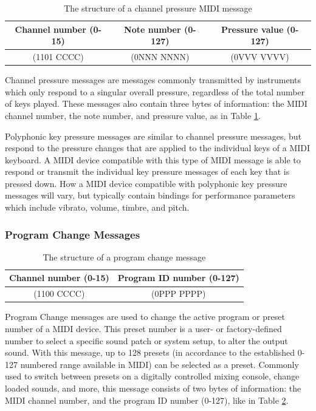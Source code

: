 \begin{table}
	\centering
	\begin{tabular}{|c|c|c|}
	\hline
		Channel number (0-15) & Note number (0-127) & Pressure value (0-127) \\
		\hline
		(1101 CCCC) & (0NNN NNNN) & (0VVV VVVV) \\
	\hline
	\end{tabular}
	\caption{The structure of a channel pressure MIDI message}
	\label{tbl:byte-structure-channel-pressure-messages}
\end{table}

Channel pressure messages are messages commonly transmitted by instruments which only respond to a singular overall pressure, regardless of the total number of keys played. These messages also contain three bytes of information: the MIDI channel number, the note number, and pressure value, as in Table \ref{tbl:byte-structure-channel-pressure-messages}\cite{Huber_2012}. 

Polyphonic key pressure messages are similar to channel pressure messages, but respond to the pressure changes that are applied to the individual keys of a MIDI keyboard. A MIDI device compatible with this type of MIDI message is able to respond or transmit the individual key pressure messages of each key that is pressed down. How a MIDI device compatible with polyphonic key pressure messages will vary, but typically contain bindings for performance parameters which include vibrato, volume, timbre, and pitch\cite{McGuire_2014}. %

\subsubsection{Program Change Messages}

\begin{table}
	\centering
	\begin{tabular}{|c|c|}
	\hline
		Channel number (0-15) & Program ID number (0-127) \\
		\hline
		(1100 CCCC) & (0PPP PPPP) \\
	\hline
	\end{tabular}
	\caption{The structure of a program change message}
	\label{tbl:byte-structure-program-change}
\end{table}

Program Change messages are used to change the active program or preset number of a MIDI device. This preset number is a user- or factory-defined number to select a specific sound patch or system setup, to alter the output sound. With this message, up to 128 presets (in accordance to the established 0-127 numbered range available in MIDI) can be selected as a preset\cite{Huber_2012}. Commonly used to switch between presets on a digitally controlled mixing console, change loaded sounds, and more, this message consists of two bytes of information: the MIDI channel number, and the program ID number (0-127), like in Table \ref{tbl:byte-structure-program-change}.


